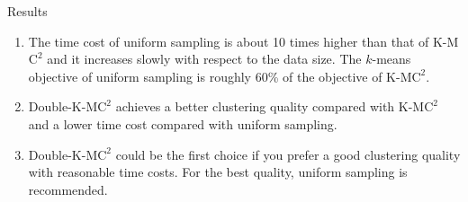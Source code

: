 \documentclass{beamer}
\begin{document}
\begin{frame}{Results}
	\begin{minipage}{0.4\linewidth}
		\scriptsize
		\begin{enumerate}
			\item The time cost of uniform sampling is about
			10 times higher than that of K-M$\text{C}^2$ and it increases slowly with
			respect to the data size. The $k$-means objective of uniform sampling is
			roughly 60\% of the objective of K-M$\text{C}^2$.
			\item Double-K-M$\text{C}^2$ achieves a better clustering quality compared
			with K-M$\text{C}^2$ and a lower time cost compared with uniform sampling.
			\item Double-K-M$\text{C}^2$ could be the first choice if you prefer a good clustering quality with reasonable time costs. For the best quality, uniform sampling is recommended.
		\end{enumerate}
	\end{minipage}
\end{frame}
\end{document}
